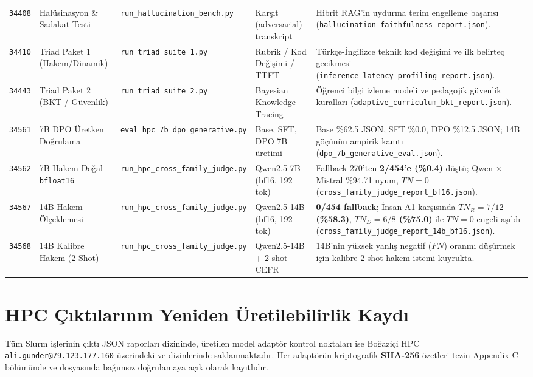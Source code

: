 \documentclass[10pt,a4paper]{article}
\begin{document}
\begin{tabularx}{\textwidth}{lp{2.8cm}p{3.4cm}p{3.2cm}X}
\addlinespace
\texttt{34408} & Halüsinasyon \& Sadakat Testi & \texttt{run\_hallucination\_bench.py} & Karşıt (adversarial) transkript & Hibrit RAG'in uydurma terim engelleme başarısı (\texttt{hallucination\_faithfulness\_report.json}). \\
\addlinespace
\texttt{34410} & Triad Paket 1 (Hakem/Dinamik) & \texttt{run\_triad\_suite\_1.py} & Rubrik / Kod Değişimi / TTFT & Türkçe-İngilizce teknik kod değişimi ve ilk belirteç gecikmesi (\texttt{inference\_latency\_profiling\_report.json}). \\
\addlinespace
\texttt{34443} & Triad Paket 2 (BKT / Güvenlik) & \texttt{run\_triad\_suite\_2.py} & Bayesian Knowledge Tracing & Öğrenci bilgi izleme modeli ve pedagojik güvenlik kuralları (\texttt{adaptive\_curriculum\_bkt\_report.json}). \\
\addlinespace
\texttt{34561} & 7B DPO Üretken Doğrulama & \texttt{eval\_hpc\_7b\_dpo\_generative.py} & Base, SFT, DPO 7B üretimi & Base \%62.5 JSON, SFT \%0.0, DPO \%12.5 JSON; 14B göçünün ampirik kanıtı (\texttt{dpo\_7b\_generative\_eval.json}). \\
\addlinespace
\texttt{34562} & 7B Hakem Doğal \texttt{bfloat16} & \texttt{run\_hpc\_cross\_family\_judge.py} & Qwen2.5-7B (bf16, 192 tok) & Fallback 270'ten \textbf{2/454'e (\%0.4)} düştü; Qwen $\times$ Mistral \%94.71 uyum, $TN=0$ (\texttt{cross\_family\_judge\_report\_bf16.json}). \\
\addlinespace
\texttt{34567} & 14B Hakem Ölçeklemesi & \texttt{run\_hpc\_cross\_family\_judge.py} & Qwen2.5-14B (bf16, 192 tok) & \textbf{0/454 fallback}; İnsan A1 karşısında \textbf{$TN_R=7/12$ (\%58.3)}, \textbf{$TN_D=6/8$ (\%75.0)} ile $TN=0$ engeli aşıldı (\texttt{cross\_family\_judge\_report\_14b\_bf16.json}). \\
\addlinespace
\texttt{34568} & 14B Kalibre Hakem (2-Shot) & \texttt{run\_hpc\_cross\_family\_judge.py} & Qwen2.5-14B + 2-shot CEFR & 14B'nin yüksek yanlış negatif ($FN$) oranını düşürmek için kalibre 2-shot hakem istemi kuyrukta. \\
\bottomrule
\end{tabularx}

\vspace{0.4cm}

\section{HPC Çıktılarının Yeniden Üretilebilirlik Kaydı}
\small
Tüm Slurm işlerinin çıktı JSON raporları  dizininde, üretilen model adaptör kontrol noktaları ise Boğaziçi HPC \texttt{ali.gunder@79.123.177.160} üzerindeki  ve  dizinlerinde saklanmaktadır. Her adaptörün kriptografik \textbf{SHA-256} özetleri tezin Appendix C bölümünde ve  dosyasında bağımsız doğrulamaya açık olarak kayıtlıdır.
\end{document}
